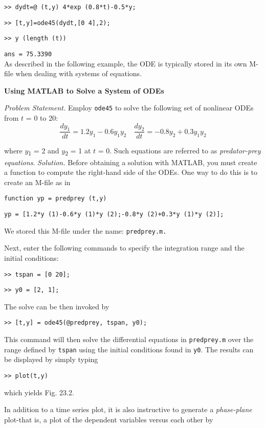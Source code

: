 \documentclass[../main.tex]{subfiles}
\begin{document}
\texttt{>> dydt=@ (t,y) 4*exp (0.8*t)-0.5*y;}

\texttt{>> [t,y]=ode45(dydt,[0 4],2);}

\texttt{>> y (length (t))}


\texttt{ans = 75.3390}\\
As described in the following example, the ODE is typically stored in its own M-file when
dealing with systems of equations.

\begin{example} \textbf{Using MATLAB to Solve a System of ODEs}

    \noindent\textit{Problem Statement.} Employ \texttt{ode45} to solve the following set of nonlinear ODEs from $t$ = 0 to 20:
    \begin{equation}
        \frac{d y_{1}}{d t}=1.2 y_{1}-0.6 y_{1} y_{2} \quad \frac{d y_{2}}{d t}=-0.8 y_{2}+0.3 y_{1} y_{2}  \nonumber
    \end{equation}

\noindent where $y$\textsubscript{1} = 2 and $y$\textsubscript{2} = 1 at $t$ = 0. Such equations are referred to as \textit{predator-prey equations}.
\textit{Solution.} Before obtaining a solution with MATLAB, you must create a function to compute the right-hand side of the ODEs. One way to do this is to create an M-file as in

\texttt{function yp = predprey (t,y)}

\texttt{yp = [1.2*y (1)-0.6*y (1)*y (2);-0.8*y (2)+0.3*y (1)*y (2)];}

\noindent We stored this M-file under the name: \texttt{predprey.m.}

\noindent Next, enter the following commands to specify the integration range and the initial
conditions:

\texttt{>> tspan = [0 20];}

\texttt{>> y0 = [2, 1];}

\noindent The solve can be then invoked by

\texttt{>> [t,y] = ode45(@predprey, tspan, y0);}

\noindent This command will then solve the differential equations in \texttt{predprey.m} over the range
defined by \texttt{tspan} using the initial conditions found in \texttt{y0}. The results can be displayed by simply typing

\texttt{>> plot(t,y)}

\noindent which yields Fig. 23.2.

In addition to a time series plot, it is also instructive to generate a \textit{phase-plane} plot-that is, a plot of the dependent variables versus each other by


\end{example}
\end{document}
